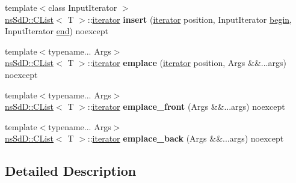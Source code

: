 \begin{DoxyCompactItemize}
\item 
\hypertarget{classnsSdD_1_1CList_a19a9ef6e137eb6e2ceb05e7a95e5037f}{{\footnotesize template$<$class Input\+Iterator $>$ }\\\hyperlink{classnsSdD_1_1CList}{ns\+Sd\+D\+::\+C\+List}$<$ T $>$\+::\hyperlink{classnsSdD_1_1CList_afdaca29586106fc15940d8529f4990f8}{iterator} {\bfseries insert} (\hyperlink{classnsSdD_1_1CList_afdaca29586106fc15940d8529f4990f8}{iterator} position, Input\+Iterator \hyperlink{classnsSdD_1_1CList_aa388b52d241c12737c4e5b2a36c767c3}{begin}, Input\+Iterator \hyperlink{classnsSdD_1_1CList_ae1ed05415dfeb92174e030f9de754dc2}{end}) noexcept}\label{classnsSdD_1_1CList_a19a9ef6e137eb6e2ceb05e7a95e5037f}

\item 
\hypertarget{classnsSdD_1_1CList_a1d2f50927ea9f6bf2894890e7acc0ab2}{{\footnotesize template$<$typename... Args$>$ }\\\hyperlink{classnsSdD_1_1CList}{ns\+Sd\+D\+::\+C\+List}$<$ T $>$\+::\hyperlink{classnsSdD_1_1CList_afdaca29586106fc15940d8529f4990f8}{iterator} {\bfseries emplace} (\hyperlink{classnsSdD_1_1CList_afdaca29586106fc15940d8529f4990f8}{iterator} position, Args \&\&...args) noexcept}\label{classnsSdD_1_1CList_a1d2f50927ea9f6bf2894890e7acc0ab2}

\item 
\hypertarget{classnsSdD_1_1CList_ac838590e674e7f73357e721c14357051}{{\footnotesize template$<$typename... Args$>$ }\\\hyperlink{classnsSdD_1_1CList}{ns\+Sd\+D\+::\+C\+List}$<$ T $>$\+::\hyperlink{classnsSdD_1_1CList_afdaca29586106fc15940d8529f4990f8}{iterator} {\bfseries emplace\+\_\+front} (Args \&\&...args) noexcept}\label{classnsSdD_1_1CList_ac838590e674e7f73357e721c14357051}

\item 
\hypertarget{classnsSdD_1_1CList_abf3d896577558cac038f8af9a788c673}{{\footnotesize template$<$typename... Args$>$ }\\\hyperlink{classnsSdD_1_1CList}{ns\+Sd\+D\+::\+C\+List}$<$ T $>$\+::\hyperlink{classnsSdD_1_1CList_afdaca29586106fc15940d8529f4990f8}{iterator} {\bfseries emplace\+\_\+back} (Args \&\&...args) noexcept}\label{classnsSdD_1_1CList_abf3d896577558cac038f8af9a788c673}

\end{DoxyCompactItemize}


\subsection{Detailed Description}
